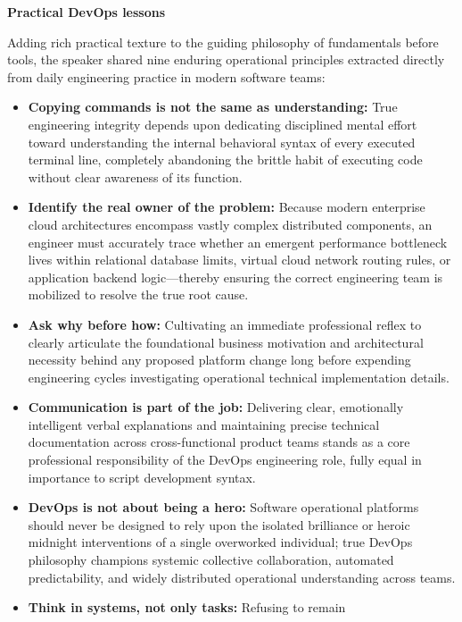 \vspace{0.5em}\noindent\textbf{Practical DevOps lessons}\par

Adding rich practical texture to the guiding philosophy of fundamentals
before tools, the speaker shared nine enduring operational principles
extracted directly from daily engineering practice in modern software
teams:

\begin{itemize}
\tightlist
\item
  \textbf{Copying commands is not the same as understanding:} True
  engineering integrity depends upon dedicating disciplined mental
  effort toward understanding the internal behavioral syntax of every
  executed terminal line, completely abandoning the brittle habit of
  executing code without clear awareness of its function.
\item
  \textbf{Identify the real owner of the problem:} Because modern
  enterprise cloud architectures encompass vastly complex distributed
  components, an engineer must accurately trace whether an emergent
  performance bottleneck lives within relational database limits,
  virtual cloud network routing rules, or application backend
  logic---thereby ensuring the correct engineering team is mobilized to
  resolve the true root cause.
\item
  \textbf{Ask why before how:} Cultivating an immediate professional
  reflex to clearly articulate the foundational business motivation and
  architectural necessity behind any proposed platform change long
  before expending engineering cycles investigating operational
  technical implementation details.
\item
  \textbf{Communication is part of the job:} Delivering clear,
  emotionally intelligent verbal explanations and maintaining precise
  technical documentation across cross-functional product teams stands
  as a core professional responsibility of the DevOps engineering role,
  fully equal in importance to script development syntax.
\item
  \textbf{DevOps is not about being a hero:} Software operational
  platforms should never be designed to rely upon the isolated
  brilliance or heroic midnight interventions of a single overworked
  individual; true DevOps philosophy champions systemic collective
  collaboration, automated predictability, and widely distributed
  operational understanding across teams.
\item
  \textbf{Think in systems, not only tasks:} Refusing to remain

\end{itemize}
